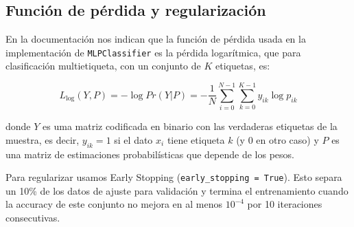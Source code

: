 \documentclass[a4]{article}
\begin{document}
\subsection{Función de pérdida y regularización}

En la documentación nos indican que la función de pérdida usada en la
implementación de \texttt{MLPClassifier} es la pérdida logarítmica,
que para clasificación multietiqueta, con un conjunto de $K$
etiquetas, es:

\[ L_{\log}(Y,P) = -\log Pr(Y|P) = -\frac{1}{N}\sum\limits_{i=0}^{N-1}\sum\limits_{k=0}^{K-1} y_{ik}\log p_{ik}\]

donde $Y$ es uma matriz codificada en binario con las verdaderas
etiquetas de la muestra, es decir, $y_{ik} = 1$ si el dato $x_i$ tiene
etiqueta $k$ (y $0$ en otro caso) y $P$ es una matriz de estimaciones
probabilísticas que depende de los pesos.

Para regularizar usamos Early Stopping (\texttt{early\_stopping =
  True}). Esto separa un 10\% de los datos de ajuste para validación y
termina el entrenamiento cuando la accuracy de este conjunto no mejora
en al menos $10^{-4}$ por 10 iteraciones consecutivas.

\end{document}
